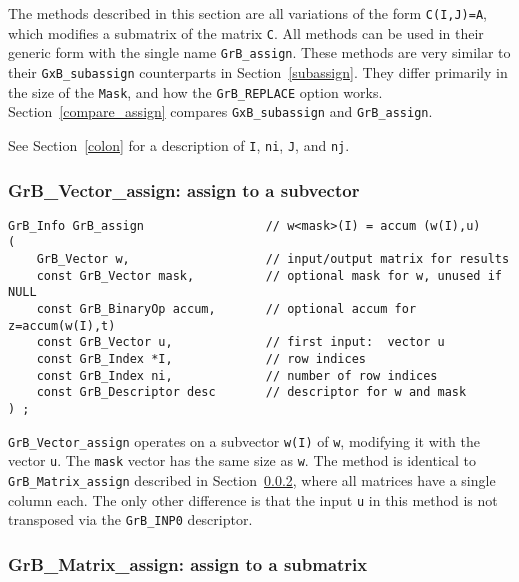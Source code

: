 \documentclass[12pt]{article}
\begin{document}
The methods described in this section are all variations of the form
\verb'C(I,J)=A', which modifies a submatrix of the matrix \verb'C'.  All
methods can be used in their generic form with the single name
\verb'GrB_assign'.  These methods are very similar to their
\verb'GxB_subassign' counterparts in Section~\ref{subassign}.  They differ
primarily in the size of the \verb'Mask', and how the \verb'GrB_REPLACE' option
works.  Section~\ref{compare_assign} compares
\verb'GxB_subassign' and \verb'GrB_assign'.

See Section~\ref{colon} for a description of
\verb'I', \verb'ni', \verb'J', and \verb'nj'.

\subsubsection{{\sf GrB\_Vector\_assign:} assign to a subvector }
\label{assign_vector}

\begin{mdframed}[userdefinedwidth=6in]
{\footnotesize
\begin{verbatim}
GrB_Info GrB_assign                 // w<mask>(I) = accum (w(I),u)
(
    GrB_Vector w,                   // input/output matrix for results
    const GrB_Vector mask,          // optional mask for w, unused if NULL
    const GrB_BinaryOp accum,       // optional accum for z=accum(w(I),t)
    const GrB_Vector u,             // first input:  vector u
    const GrB_Index *I,             // row indices
    const GrB_Index ni,             // number of row indices
    const GrB_Descriptor desc       // descriptor for w and mask
) ;
\end{verbatim} } \end{mdframed}

\verb'GrB_Vector_assign' operates on a subvector \verb'w(I)' of \verb'w',
modifying it with the vector \verb'u'.  The \verb'mask' vector has the same
size as \verb'w'.  The method is identical to \verb'GrB_Matrix_assign'
described in Section~\ref{assign_matrix}, where all matrices have a single
column each.  The only other difference is that the input \verb'u' in this
method is not transposed via the \verb'GrB_INP0' descriptor.

\newpage
\subsubsection{{\sf GrB\_Matrix\_assign:} assign to a submatrix }
\label{assign_matrix}
\end{document}
